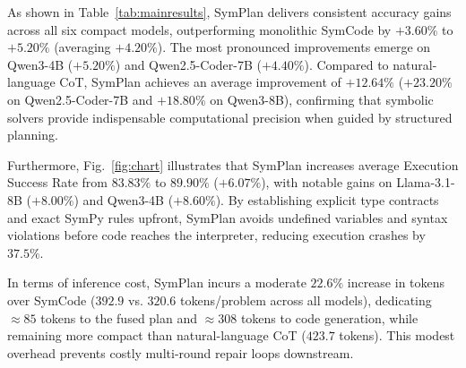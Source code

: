 \documentclass[conference,a4paper]{IEEEtran}
\begin{document}
As shown in Table~\ref{tab:mainresults}, SymPlan delivers consistent accuracy gains across all six compact models, outperforming monolithic SymCode by $+3.60\%$ to $+5.20\%$ (averaging $+4.20\%$). The most pronounced improvements emerge on Qwen3-4B ($+5.20\%$) and Qwen2.5-Coder-7B ($+4.40\%$). Compared to natural-language CoT, SymPlan achieves an average improvement of $+12.64\%$ ($+23.20\%$ on Qwen2.5-Coder-7B and $+18.80\%$ on Qwen3-8B), confirming that symbolic solvers provide indispensable computational precision when guided by structured planning.

Furthermore, Fig.~\ref{fig:chart} illustrates that SymPlan increases average Execution Success Rate from $83.83\%$ to $89.90\%$ ($+6.07\%$), with notable gains on Llama-3.1-8B ($+8.00\%$) and Qwen3-4B ($+8.60\%$). By establishing explicit type contracts and exact SymPy rules upfront, SymPlan avoids undefined variables and syntax violations before code reaches the interpreter, reducing execution crashes by $37.5\%$.

In terms of inference cost, SymPlan incurs a moderate $22.6\%$ increase in tokens over SymCode ($392.9$ vs. $320.6$ tokens/problem across all models), dedicating $\approx 85$ tokens to the fused plan and $\approx 308$ tokens to code generation, while remaining more compact than natural-language CoT ($423.7$ tokens). This modest overhead prevents costly multi-round repair loops downstream.

\begin{table}[t]
\centering
\caption{Accuracy (\%) by difficulty level on MATH-500 for Qwen2.5-Coder-7B and Qwen3-8B.}
\label{tab:levels}
\end{table}
\end{document}
